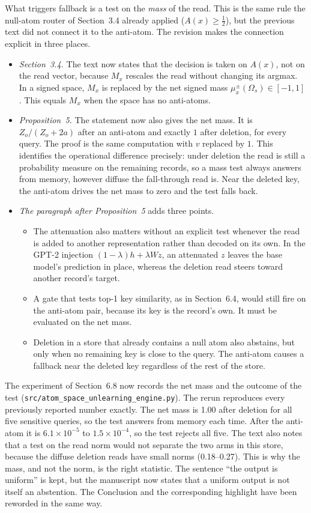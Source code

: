 \documentclass[11pt]{article}
\begin{document}
What triggers fallback is a test on the \emph{mass} of the read. This is the same rule the null-atom router of Section~3.4 already applied ($A(x)\ge\tfrac12$), but the previous text did not connect it to the anti-atom. The revision makes the connection explicit in three places.
\begin{itemize}
\item \emph{Section~3.4.} The text now states that the decision is taken on $A(x)$, not on the read vector, because $M_x$ rescales the read without changing its argmax. In a signed space, $M_x$ is replaced by the net signed mass $\mu_x^{\pm}(\Omega_s)\in[-1,1]$. This equals $M_x$ when the space has no anti-atoms.
\item \emph{Proposition~5.} The statement now also gives the net mass. It is $Z_o/(Z_o+2a)$ after an anti-atom and exactly $1$ after deletion, for every query. The proof is the same computation with $v$ replaced by $1$. This identifies the operational difference precisely: under deletion the read is still a probability measure on the remaining records, so a mass test always answers from memory, however diffuse the fall-through read is. Near the deleted key, the anti-atom drives the net mass to zero and the test falls back.
\item \emph{The paragraph after Proposition~5} adds three points.
  \begin{itemize}
  \item The attenuation also matters without an explicit test whenever the read is added to another representation rather than decoded on its own. In the GPT-2 injection $(1-\lambda)h+\lambda Wz$, an attenuated $z$ leaves the base model's prediction in place, whereas the deletion read steers toward another record's target.
  \item A gate that tests top-1 key similarity, as in Section~6.4, would still fire on the anti-atom pair, because its key is the record's own. It must be evaluated on the net mass.
  \item Deletion in a store that already contains a null atom also abstains, but only when no remaining key is close to the query. The anti-atom causes a fallback near the deleted key regardless of the rest of the store.
  \end{itemize}
\end{itemize}

The experiment of Section~6.8 now records the net mass and the outcome of the test (\nolinkurl{src/atom_space_unlearning_engine.py}). The rerun reproduces every previously reported number exactly. The net mass is 1.00 after deletion for all five sensitive queries, so the test answers from memory each time. After the anti-atom it is $6.1\times10^{-5}$ to $1.5\times10^{-4}$, so the test rejects all five. The text also notes that a test on the read norm would not separate the two arms in this store, because the diffuse deletion reads have small norms (0.18--0.27). This is why the mass, and not the norm, is the right statistic. The sentence ``the output is uniform'' is kept, but the manuscript now states that a uniform output is not itself an abstention. The Conclusion and the corresponding highlight have been reworded in the same way.
\end{document}
